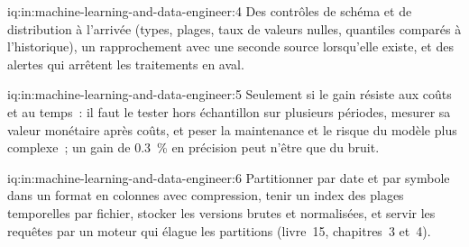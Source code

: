 \begin{solution}{iq:in:machine-learning-and-data-engineer:4}
Des contrôles de schéma et de distribution à l'arrivée (types, plages, taux de valeurs nulles, quantiles comparés à l'historique), un rapprochement avec
une seconde source lorsqu'elle existe, et des alertes qui arrêtent les traitements en aval.
\end{solution}

\begin{solution}{iq:in:machine-learning-and-data-engineer:5}
Seulement si le gain résiste aux coûts et au temps~: il faut le tester hors échantillon sur plusieurs périodes, mesurer sa valeur
monétaire après coûts, et peser la maintenance et le risque du modèle plus complexe~; un gain de 0.3~\% en précision peut n'être que du bruit.
\end{solution}

\begin{solution}{iq:in:machine-learning-and-data-engineer:6}
Partitionner par date et par symbole dans un format en colonnes avec compression, tenir un index des plages temporelles par fichier, stocker les versions brutes et
normalisées, et servir les requêtes par un moteur qui élague les partitions (livre~15, chapitres~3 et~4).
\end{solution}

